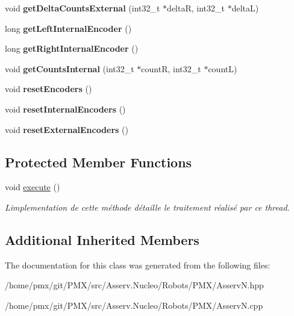 \begin{DoxyCompactItemize}
\mbox{\label{classAsservN_a1faa9318339e6e8ca5d699c6a9a718e0}} 
void {\bfseries get\+Delta\+Counts\+External} (int32\+\_\+t $\ast$deltaR, int32\+\_\+t $\ast$deltaL)
\item 
\mbox{\label{classAsservN_a446c346c518d4599d75ee9c14e6aa16a}} 
long {\bfseries get\+Left\+Internal\+Encoder} ()
\item 
\mbox{\label{classAsservN_a0d3689c8143b2d0b3eded0280d6a0546}} 
long {\bfseries get\+Right\+Internal\+Encoder} ()
\item 
\mbox{\label{classAsservN_aae30fa08c6c20d98fc201b06e9efa417}} 
void {\bfseries get\+Counts\+Internal} (int32\+\_\+t $\ast$countR, int32\+\_\+t $\ast$countL)
\item 
\mbox{\label{classAsservN_a62afa465750657f93df927e31c3ac1d6}} 
void {\bfseries reset\+Encoders} ()
\item 
\mbox{\label{classAsservN_a8c09510937dcf3be4bd204b9b0aff1e7}} 
void {\bfseries reset\+Internal\+Encoders} ()
\item 
\mbox{\label{classAsservN_abfe384bec9f33d695a914f1b3b70b02c}} 
void {\bfseries reset\+External\+Encoders} ()
\end{DoxyCompactItemize}
\subsection*{Protected Member Functions}
\begin{DoxyCompactItemize}
\item 
\mbox{\label{classAsservN_a85a855eb1b0803d016ff97a286a95eba}} 
void \hyperlink{classAsservN_a85a855eb1b0803d016ff97a286a95eba}{execute} ()
\begin{DoxyCompactList}\small\item\em L\textquotesingle{}implementation de cette méthode détaille le traitement réalisé par ce thread. \end{DoxyCompactList}\end{DoxyCompactItemize}
\subsection*{Additional Inherited Members}


The documentation for this class was generated from the following files\+:\begin{DoxyCompactItemize}
\item 
/home/pmx/git/\+P\+M\+X/src/\+Asserv.\+Nucleo/\+Robots/\+P\+M\+X/Asserv\+N.\+hpp\item 
/home/pmx/git/\+P\+M\+X/src/\+Asserv.\+Nucleo/\+Robots/\+P\+M\+X/Asserv\+N.\+cpp\end{DoxyCompactItemize}
